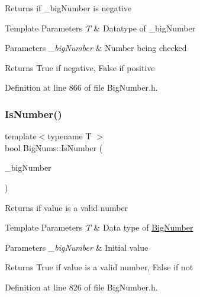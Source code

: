 Returns if \+\_\+big\+Number is negative 
\begin{DoxyTemplParams}{Template Parameters}
{\em T} & Datatype of \+\_\+big\+Number \\
\hline
\end{DoxyTemplParams}

\begin{DoxyParams}{Parameters}
{\em \+\_\+big\+Number} & Number being checked \\
\hline
\end{DoxyParams}
\begin{DoxyReturn}{Returns}
True if negative, False if positive 
\end{DoxyReturn}


Definition at line 866 of file Big\+Number.\+h.

\mbox{\label{namespace_big_nums_a3353e9045574582f6c7b5f243f700716}} 
\subsubsection{\texorpdfstring{IsNumber()}{IsNumber()}}
{\footnotesize\ttfamily template$<$typename T $>$ \\
bool Big\+Nums\+::\+Is\+Number (\begin{DoxyParamCaption}\item[{const T \&}]{\+\_\+big\+Number }\end{DoxyParamCaption})}

Returns if value is a valid number 
\begin{DoxyTemplParams}{Template Parameters}
{\em T} & Data type of \mbox{\hyperlink{class_big_nums_1_1_big_number}{Big\+Number}} \\
\hline
\end{DoxyTemplParams}

\begin{DoxyParams}{Parameters}
{\em \+\_\+big\+Number} & Initial value \\
\hline
\end{DoxyParams}
\begin{DoxyReturn}{Returns}
True if value is a valid number, False if not 
\end{DoxyReturn}


Definition at line 826 of file Big\+Number.\+h.

\mbox{\label{namespace_big_nums_ad10e532cfb62a71e7c6b68f5941362d5}} 
